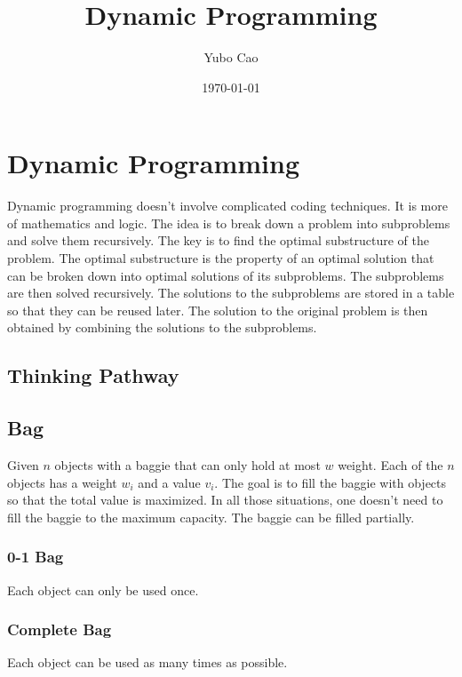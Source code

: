 \documentclass{article}
\title{Dynamic Programming}
\author{Yubo Cao}
\date{\today}
\begin{document}
\maketitle
\tableofcontents
\newpage

\section{Dynamic Programming}

Dynamic programming doesn't involve complicated coding techniques. It is more of mathematics and logic. The idea is to break down a problem into subproblems and solve them recursively. The key is to find the optimal substructure of the problem. The optimal substructure is the property of an optimal solution that can be broken down into optimal solutions of its subproblems. The subproblems are then solved recursively. The solutions to the subproblems are stored in a table so that they can be reused later. The solution to the original problem is then obtained by combining the solutions to the subproblems.

\subsection{Thinking Pathway}



\subsection{Bag}

Given $n$ objects with a baggie that can only hold at most $w$ weight. Each of the $n$ objects has a weight $w_i$ and a value $v_i$. The goal is to fill the baggie with objects so that the total value is maximized. In all those situations, one doesn't need to fill the baggie to the maximum capacity. The baggie can be filled partially.

\subsubsection{0-1 Bag}

Each object can only be used once.

\subsubsection{Complete Bag}

Each object can be used as many times as possible.
\end{document}
